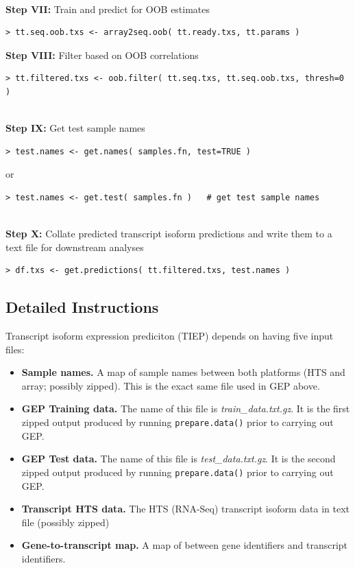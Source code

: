 \documentclass[a4paper,12pt]{article}
\begin{document}
\noindent\\
\textbf{Step VII:} Train and predict for OOB estimates
\begin{verbatim}
> tt.seq.oob.txs <- array2seq.oob( tt.ready.txs, tt.params )
\end{verbatim}
\textbf{Step VIII:} Filter based on OOB correlations
\begin{verbatim}
> tt.filtered.txs <- oob.filter( tt.seq.txs, tt.seq.oob.txs, thresh=0 )
\end{verbatim}

\noindent\\
\textbf{Step IX:} Get test sample names
\begin{verbatim}
> test.names <- get.names( samples.fn, test=TRUE )
\end{verbatim}
or 
\begin{verbatim}
> test.names <- get.test( samples.fn )   # get test sample names
\end{verbatim}

\noindent\\
\textbf{Step X:} Collate predicted transcript isoform predictions and write them to a text file for downstream analyses
\begin{verbatim}
> df.txs <- get.predictions( tt.filtered.txs, test.names )
\end{verbatim}

\subsection{Detailed Instructions}
\label{tiep:detailed}
Transcript isoform expression prediciton (TIEP) depends on having five input files:
\begin{itemize}
\item \textbf{Sample names.} A map of sample names between both platforms (HTS and array; possibly zipped). This is the exact same file used in GEP above.
\item \textbf{GEP Training data.} The name of this file is \textit{train\_data.txt.gz}. It is the first zipped output produced by running \texttt{prepare.data()} prior to carrying out GEP.
\item \textbf{GEP Test data.} The name of this file is \textit{test\_data.txt.gz}. It is the second zipped output produced by running \texttt{prepare.data()} prior to carrying out GEP.
\item \textbf{Transcript HTS data.} The HTS (RNA-Seq) transcript isoform data in text file (possibly zipped)
\item \textbf{Gene-to-transcript map.} A map of between gene identifiers and transcript identifiers. 
\end{itemize}
\end{document}
